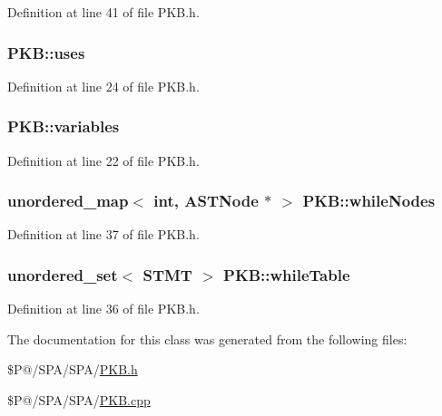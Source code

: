 Definition at line 41 of file P\-K\-B.\-h.

\hypertarget{class_p_k_b_aec685879d658ff43471889ddbee175a9}{
\subsubsection[{uses}]{ P\-K\-B\-::uses\hspace{0.3cm}{\ttfamily [static]}}}\label{class_p_k_b_aec685879d658ff43471889ddbee175a9}


Definition at line 24 of file P\-K\-B.\-h.

\hypertarget{class_p_k_b_a04a10fef1b34afbe28d6e217e7e11d20}{
\subsubsection[{variables}]{ P\-K\-B\-::variables\hspace{0.3cm}{\ttfamily [static]}}}\label{class_p_k_b_a04a10fef1b34afbe28d6e217e7e11d20}


Definition at line 22 of file P\-K\-B.\-h.

\hypertarget{class_p_k_b_a4be6809486f222460f02b45261602dc7}{
\subsubsection[{while\-Nodes}]{\setlength{\rightskip}{0pt plus 5cm}unordered\-\_\-map$<$ int, {\bf A\-S\-T\-Node} $\ast$ $>$ P\-K\-B\-::while\-Nodes\hspace{0.3cm}{\ttfamily [static]}}}\label{class_p_k_b_a4be6809486f222460f02b45261602dc7}


Definition at line 37 of file P\-K\-B.\-h.

\hypertarget{class_p_k_b_ac2d6057e757e3f104e38866f8b6a16e9}{
\subsubsection[{while\-Table}]{\setlength{\rightskip}{0pt plus 5cm}unordered\-\_\-set$<$ {\bf S\-T\-M\-T} $>$ P\-K\-B\-::while\-Table\hspace{0.3cm}{\ttfamily [static]}}}\label{class_p_k_b_ac2d6057e757e3f104e38866f8b6a16e9}


Definition at line 36 of file P\-K\-B.\-h.



The documentation for this class was generated from the following files\-:\begin{DoxyCompactItemize}
\item 
\$\-P@/\-S\-P\-A/\-S\-P\-A/\hyperlink{_p_k_b_8h}{P\-K\-B.\-h}\item 
\$\-P@/\-S\-P\-A/\-S\-P\-A/\hyperlink{_p_k_b_8cpp}{P\-K\-B.\-cpp}\end{DoxyCompactItemize}
